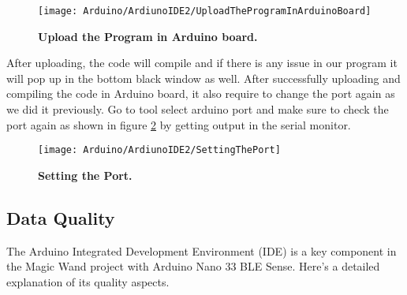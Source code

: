 \begin{figure}[H]\centering
    \texttt{[image: Arduino/ArdiunoIDE2/UploadTheProgramInArduinoBoard]}
    \caption{\textbf{Upload the Program in Arduino board.}}
    \label{fig:Upload the Program in Arduino board}		
\end{figure}

After uploading, the code will compile and if there is any issue in our program it will pop up in the bottom black window as well.
After successfully uploading and compiling the code in Arduino board, it also require to change the port again as we did it previously. Go to tool select arduino port and
make sure to check the port again as shown in figure \ref{fig:Setting the Port} by getting output in the
serial monitor.

\begin{figure}[H]\centering
    \texttt{[image: Arduino/ArdiunoIDE2/SettingThePort]}
    \caption{\textbf{Setting the Port.}}
    \label{fig:Setting the Port}		
\end{figure} 


\subsection{Data Quality}

The Arduino Integrated Development Environment (IDE) is a key component in the Magic Wand project with Arduino Nano 33 BLE Sense. Here's a detailed explanation of its quality aspects. \cite{Fezari:2018}


